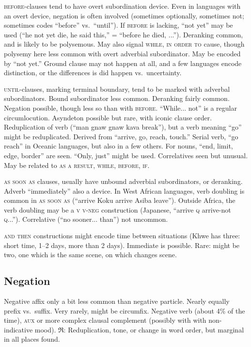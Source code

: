\documentclass[11pt]{article}
\newcommand{\I}[1]{\textsc{#1}}   %
\newcommand{\rara}[1]{$\mathfrak{R}$: #1}
\begin{document}
{\I{before}-clauses tend to have overt subordination device.  Even in
languages with an overt device, negation is often involved (sometimes
optionally, sometimes not; sometimes codes ``before'' vs.\ ``until'').
If \I{before} is lacking, ``not yet'' may be used (``he not yet die,
he said this,'' = ``before he died, ...'').  Deranking common, and is
likely to be polysemous.  May also signal \I{while, in order to}
cause, though polysemy here less common with overt adverbial
subordinator.  May be encoded by ``not yet.''  Ground clause may not
happen at all, and a few languages encode distinction, or the
differences is did happen vs.\ uncertainty.

\I{until}-clauses, marking terminal boundary, tend to be marked with
adverbal subordinators.  Bound subordinator less common.  Deranking
fairly common.  Negation possible, though less so than with
\I{before}.  ``While... not'' is a regular circumlocution.  Asyndeton
possible but rare, with iconic clause order.  Reduplication of verb
(``man gnaw gnaw kava break''), but a verb meaning ``go'' might be
reduplicated.  Derived from ``arrive, go, reach, touch.''  Serial
verb, ``go reach'' in Oceanic languages, but also in a few others.
For nouns, ``end, limit, edge, border'' are seen.  ``Only, just''
might be used.  Correlatives seen but unusual.  May be related to
\I{as a result, while, before, if}.

\I{as soon as} clauses, usually have unbound adverbial subordinators,
or deranking.  Adverb ``immediately'' also a device.  In West African
languages, verb doubling is common in \I{as soon as} (``arrive Koku
arrive Asiba leave'').  Outside Africa, the verb doubling may be a
\I{v v-neg} construction (Japanese, ``arrive \I{q} arrive-not
\I{q}...'').  Correlative (``no sooner... than'') not uncommon.

\I{and then} constructions might encode time between situations (Khwe
has three: short time, 1--2 days, more than 2 days). Immediate is
possible.  Rare: might be two, one which is the same scene, on which
changes scene.


\subsection{Negation}
Negative affix only a bit less common than negative particle.  Nearly
equally prefix vs.\ suffix.  Very rarely, might be circumfix.
Negative verb (about 4\% of the time), \I{aux} or more complex clausal
complement (possibly with with non-indicative mood).
\rara{Reduplication, tone, or change in word order, but marginal in
all places found.}

}
\end{document}
